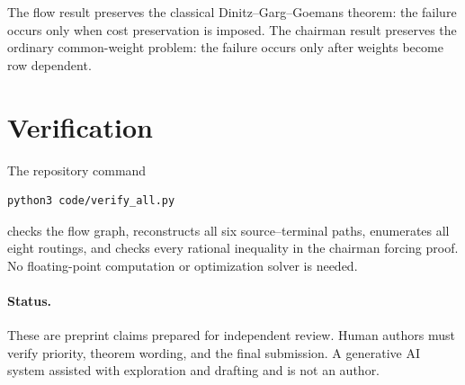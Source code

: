\documentclass[11pt]{article}
\begin{document}
The flow result preserves the classical Dinitz--Garg--Goemans theorem: the
failure occurs only when cost preservation is imposed.  The chairman result
preserves the ordinary common-weight problem: the failure occurs only after
weights become row dependent.

\section{Verification}

The repository command
\begin{verbatim}
python3 code/verify_all.py
\end{verbatim}
checks the flow graph, reconstructs all six source--terminal paths, enumerates
all eight routings, and checks every rational inequality in the chairman
forcing proof.  No floating-point computation or optimization solver is
needed.

\paragraph{Status.}
These are preprint claims prepared for independent review.  Human authors
must verify priority, theorem wording, and the final submission.  A
generative AI system assisted with exploration and drafting and is not an
author.



\end{document}
